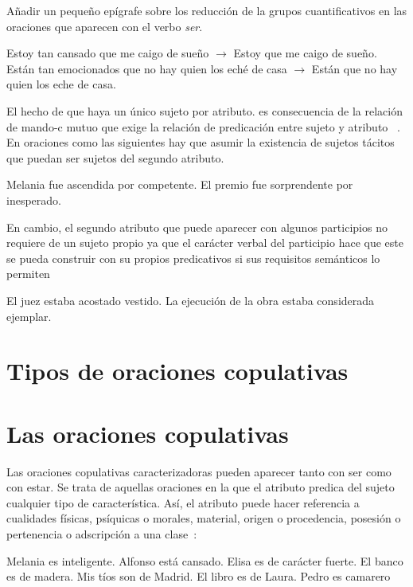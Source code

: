 Añadir un pequeño epígrafe sobre los reducción de la grupos cuantificativos en las oraciones que aparecen con el verbo \textit{ser}.

\pex[*]
\a	Estoy tan cansado que me caigo de sueño $\longrightarrow$  Estoy que me caigo de sueño.
\a	Están tan emocionados que no hay quien los eché de casa $\longrightarrow$  Están que no hay quien los eche de casa.
\xe


El hecho de que haya un único sujeto por atributo. es consecuencia de la relación de mando-c mutuo que exige la relación de predicación entre sujeto y atributo ~\autocite{Williams1980Predication,Bowers1993The-Syntax-of-Predic}. En oraciones como las siguientes hay que asumir la existencia de sujetos tácitos que puedan ser sujetos del segundo atributo.

\pex[*]
\a Melania fue ascendida por competente.
\a El premio fue sorprendente por inesperado.
\xe


En cambio, el segundo atributo que puede aparecer con algunos participios no requiere de un sujeto propio ya que el carácter verbal del participio hace que este se pueda construir con su propios predicativos si sus requisitos semánticos lo permiten~\autocite{Bosque1999el-sintagma-adjetiva}

\pex[*]
\a	El juez estaba acostado vestido.
\a	La ejecución de la obra estaba considerada ejemplar.
\xe

\section{Tipos de oraciones copulativas}


\section{Las oraciones copulativas}

Las oraciones copulativas caracterizadoras pueden aparecer tanto con ser como con estar. Se trata de aquellas oraciones en la que el atributo predica del sujeto cualquier tipo de característica. Así, el atributo puede hacer referencia a cualidades físicas, psíquicas o morales, material, origen o procedencia, posesión o pertenencia o adscripción a una clase~\parencites[][]{Leborans1999Predicacion}[][]{Bentley20179Copular-and-}:

\pex
\a Melania es inteligente.
\a Alfonso está cansado.
\a Elisa es de carácter fuerte.
\a El banco es de madera.
\a Mis tíos son de Madrid.
\a El libro es de Laura.
\a Pedro es camarero
\xe



